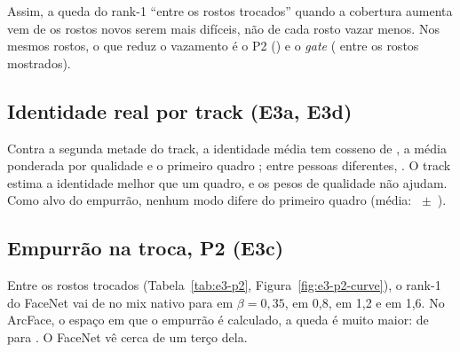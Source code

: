 Assim, a queda do rank-1 ``entre os rostos trocados'' quando a cobertura aumenta vem de os rostos novos serem mais difíceis, não de cada rosto vazar menos. Nos mesmos rostos, o que reduz o vazamento é o P2 () e o \emph{gate} ( entre os rostos mostrados).

\begin{table}[ht]\centering
\caption{Os mesmos rostos: FaceNet rank-1 de cada braço nos rostos que o BLANKET original troca e nos que só a detecção do Estágio~1 acrescenta; a primeira linha é o rosto real.}
\label{tab:e3-matched}
\resizebox{\linewidth}{!}{}
\fonteautor
\end{table}

\subsection{Identidade real por track (E3a, E3d)}

Contra a segunda metade do track, a identidade média tem cosseno de , a média ponderada por qualidade  e o primeiro quadro ; entre pessoas diferentes, . O track estima a identidade melhor que um quadro, e os pesos de qualidade não ajudam. Como alvo do empurrão, nenhum modo difere do primeiro quadro (média: ~$\pm$~).

\subsection{Empurrão na troca, P2 (E3c)}

Entre os rostos trocados (Tabela~\ref{tab:e3-p2}, Figura~\ref{fig:e3-p2-curve}), o rank-1 do FaceNet vai de  no mix nativo para  em $\beta = 0{,}35$,  em 0,8,  em 1,2 e  em 1,6. No ArcFace, o espaço em que o empurrão é calculado, a queda é muito maior: de  para . O FaceNet vê cerca de um terço dela.

